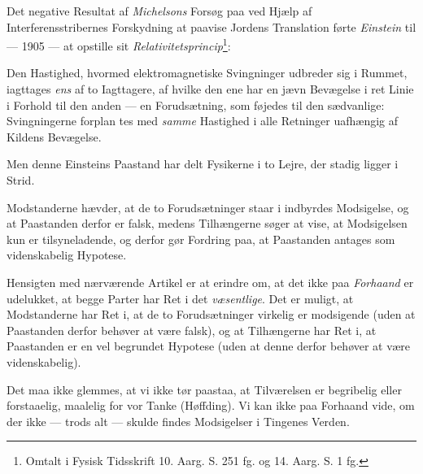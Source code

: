 \documentclass[12pt,a4paper]{article}
\newcommand{\opage}[1]{\marginnote{\footnotesize\textit{[#1]}}}
\begin{document}
\opage{13} %
\setcounter{footnote}{1}%

Det negative Resultat af \emph{Michelsons} Forsøg paa ved Hjælp af
Interferensstribernes Forskydning at paavise Jordens Translation førte
\emph{Einstein} til --- 1905 --- at opstille sit
\guillemotleft\emph{Relativitetsprincip}\footnote{Omtalt i Fysisk
Tidsskrift 10. Aarg. S. 251 fg. og 14. Aarg. S. 1 fg.}:

Den Hastighed, hvormed elektromagnetiske Svingninger udbreder sig i
Rummet, iagttages \emph{ens} af to Iagttagere, af hvilke den ene har en
jævn Bevægelse i ret Linie i Forhold til den anden --- en Forudsætning,
som føjedes til den sædvanlige: Svingningerne forplan\-%
\opage{14}tes med \emph{samme} Hastighed i alle Retninger uafhængig af Kildens
Bevægelse.

Men denne Einsteins Paastand har delt Fysikerne i to Lejre, der stadig
ligger i Strid.

Modstanderne hævder, at de to Forudsætninger staar i indbyrdes
Modsigelse, og at Paastanden derfor er falsk, medens Tilhængerne søger at
vise, at Modsigelsen kun er tilsyneladende, og derfor gør Fordring paa,
at Paastanden antages som videnskabelig Hypotese.

Hensigten med nærværende Artikel er at erindre om, at det ikke paa
\emph{Forhaand} er udelukket, at begge Parter har Ret i det
\emph{væsentlige}. Det er muligt, at Modstanderne har Ret i, at de to
Forudsætninger virkelig er modsigende (uden at Paastanden derfor behøver
at være falsk), og at Tilhængerne har Ret i, at Paastanden er en vel
begrundet Hypotese (uden at denne derfor behøver at være videnskabelig).

Det maa ikke glemmes, at vi ikke tør paastaa, at Tilværelsen er
\guillemotleft begribelig eller forstaaelig, maalelig for vor
Tanke\guillemotright{} (Høffding). Vi kan ikke paa Forhaand vide, om der
ikke --- trods alt --- skulde findes Modsigelser i Tingenes Verden.
\end{document}
